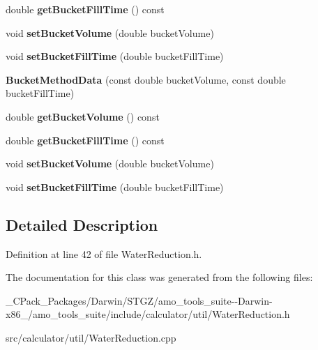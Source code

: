 \begin{DoxyCompactItemize}
double {\bfseries get\+Bucket\+Fill\+Time} () const
\item 
\mbox{\label{class_bucket_method_data_a8b3b85bb79a7f99ddc60da18cfe08454}} 
void {\bfseries set\+Bucket\+Volume} (double bucket\+Volume)
\item 
\mbox{\label{class_bucket_method_data_a9ef3dcb74da50b94e21b1b9dd3e712b0}} 
void {\bfseries set\+Bucket\+Fill\+Time} (double bucket\+Fill\+Time)
\item 
\mbox{\label{class_bucket_method_data_a5d0486b900e1e65db90d043a0bf5bd56}} 
{\bfseries Bucket\+Method\+Data} (const double bucket\+Volume, const double bucket\+Fill\+Time)
\item 
\mbox{\label{class_bucket_method_data_a423f76d6fc6766a62a931f3df1b7c213}} 
double {\bfseries get\+Bucket\+Volume} () const
\item 
\mbox{\label{class_bucket_method_data_a9617fcaa87b2baf4b39617acc4ad98a1}} 
double {\bfseries get\+Bucket\+Fill\+Time} () const
\item 
\mbox{\label{class_bucket_method_data_a8b3b85bb79a7f99ddc60da18cfe08454}} 
void {\bfseries set\+Bucket\+Volume} (double bucket\+Volume)
\item 
\mbox{\label{class_bucket_method_data_a9ef3dcb74da50b94e21b1b9dd3e712b0}} 
void {\bfseries set\+Bucket\+Fill\+Time} (double bucket\+Fill\+Time)
\end{DoxyCompactItemize}


\subsection{Detailed Description}


Definition at line 42 of file Water\+Reduction.\+h.



The documentation for this class was generated from the following files\+:\begin{DoxyCompactItemize}
\item 
\+\_\+\+C\+Pack\+\_\+\+Packages/\+Darwin/\+S\+T\+G\+Z/amo\+\_\+tools\+\_\+suite-\/-\/\+Darwin-\/x86\+\_/amo\+\_\+tools\+\_\+suite/include/calculator/util/Water\+Reduction.\+h\item 
src/calculator/util/Water\+Reduction.\+cpp\end{DoxyCompactItemize}
